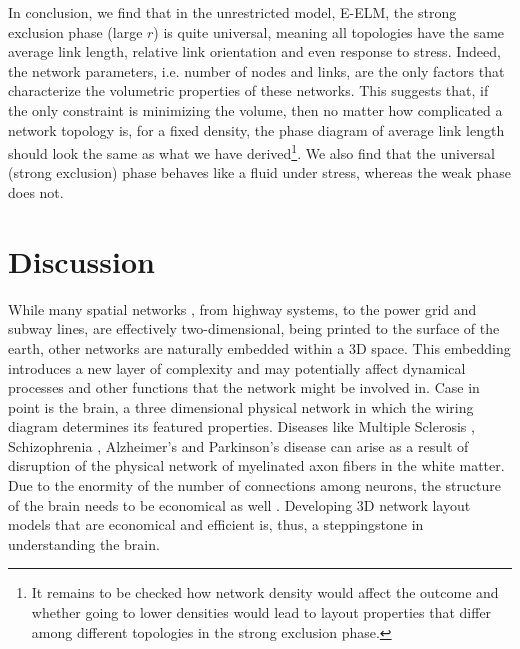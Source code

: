 \documentclass[nofootinbib,preprint,floatfix,endfloats]{revtex4} %
\begin{document}
In conclusion, we find that in the unrestricted model, E-ELM, the strong exclusion phase (large $r$) is quite universal, meaning all topologies have the same average link length, relative link orientation and even response to stress. 
Indeed, the network parameters, i.e. number of nodes and links, are the only factors that characterize the volumetric properties of these networks. 
This suggests that, if the only constraint is minimizing the volume, then no matter how complicated a network topology is, for a fixed density, the phase diagram of average link length should look the same as what we have derived\footnote{
It remains to be checked how network density would affect the outcome and whether going to lower densities would lead to layout properties that differ among different topologies in the strong exclusion phase.}.
We also find that the universal (strong exclusion) phase behaves like a fluid under stress, whereas the weak phase does not.   



\section{Discussion}

While many spatial networks \cite{barthelemy2011spatial}, from highway systems, to the power grid and subway lines, are effectively two-dimensional, 
being printed to the surface of the earth, other networks are naturally embedded within a 3D space. 
This embedding introduces a new layer of complexity and may potentially affect dynamical processes and other functions that the network might be involved in. Case in point is the brain, a three dimensional physical network in which the wiring diagram determines its featured properties. 
Diseases like Multiple Sclerosis \cite{compston2008ms,miller2007ms,miller2005ms}, Schizophrenia \cite{davis2003white,lim1999compromised,sigmundsson2001structural}, Alzheimer's \cite{mudher2002alzheimer,goedert1991tau,goedert1992tau} and Parkinson's disease \cite{bohnen2011white,beyer2006visual,hattori2012cognitive} can arise as a result of disruption of the physical network of myelinated axon fibers in the white matter. 
Due to the enormity of the number of connections among neurons, the structure of the brain needs to be economical as well \cite{bullmore2012economy,sporns2004organization,kotter2001connectional}. Developing 3D network layout models that are economical and efficient is, thus, a steppingstone in understanding the brain. 
\end{document}
